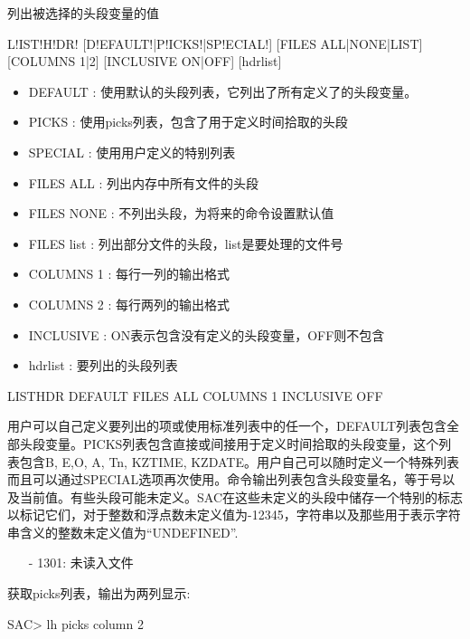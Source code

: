 \label{cmd:listhdr}

列出被选择的头段变量的值

\begin{SACSTX}
L!IST!H!DR! [D!EFAULT!|P!ICKS!|SP!ECIAL!] [FILES ALL|NONE|LIST] [COLUMNS 1|2] 
    [INCLUSIVE ON|OFF] [hdrlist]
\end{SACSTX}

\begin{itemize}
\item DEFAULT : 使用默认的头段列表，它列出了所有定义了的头段变量。
\item PICKS : 使用picks列表，包含了用于定义时间拾取的头段 
\item SPECIAL :  使用用户定义的特别列表 
\item FILES ALL : 列出内存中所有文件的头段 
\item FILES NONE : 不列出头段，为将来的命令设置默认值 
\item FILES list : 列出部分文件的头段，list是要处理的文件号 
\item COLUMNS 1 : 每行一列的输出格式  
\item COLUMNS 2 : 每行两列的输出格式  
\item INCLUSIVE :  ON表示包含没有定义的头段变量，OFF则不包含 
\item hdrlist : 要列出的头段列表  
\end{itemize}

\begin{SACDFT}
LISTHDR DEFAULT FILES ALL COLUMNS 1 INCLUSIVE OFF
\end{SACDFT}

用户可以自己定义要列出的项或使用标准列表中的任一个，DEFAULT列表包含全部头段变量。PICKS列表包含直接或间接用于定义时间拾取的头段变量，这个列表包含B, E,O, A, Tn, KZTIME, KZDATE。用户自己可以随时定义一个特殊列表而且可以通过SPECIAL选项再次使用。命令输出列表包含头段变量名，等于号以及当前值。有些头段可能未定义。SAC在这些未定义的头段中储存一个特别的标志以标记它们，对于整数和浮点数未定义值为-12345，字符串以及那些用于表示字符串含义的整数未定义值为``UNDEFINED''.

\begin{itemize}
\item[-]1301: 未读入文件
\end{itemize}

获取picks列表，输出为两列显示:
\begin{SACCode}
SAC> lh picks column 2
\end{SACCode}

